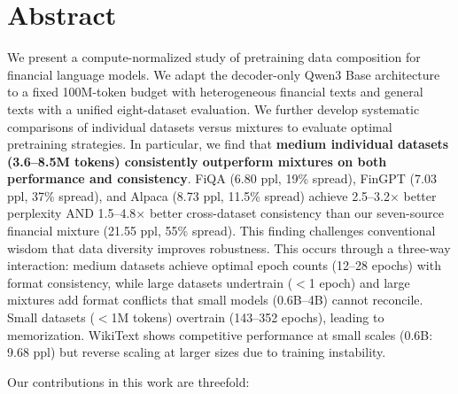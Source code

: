 \documentclass[11pt,a4paper,english,oneside]{book}
\begin{document}
\thispagestyle{empty}
\titleGP

\newpage

\setcounter{page}{1}

\section*{Abstract}
\thispagestyle{firststyle}

We present a compute-normalized study of pretraining data composition for financial language models. We adapt the decoder-only Qwen3 Base architecture to a fixed 100M-token budget with heterogeneous financial texts and general texts with a unified eight-dataset evaluation. We further develop systematic comparisons of individual datasets versus mixtures to evaluate optimal pretraining strategies. In particular, we find that \textbf{medium individual datasets (3.6–8.5M tokens) consistently outperform mixtures on both performance and consistency}. FiQA (6.80 ppl, 19\% spread), FinGPT (7.03 ppl, 37\% spread), and Alpaca (8.73 ppl, 11.5\% spread) achieve 2.5–3.2$\times$ better perplexity AND 1.5–4.8$\times$ better cross-dataset consistency than our seven-source financial mixture (21.55 ppl, 55\% spread). This finding challenges conventional wisdom that data diversity improves robustness. This occurs through a three-way interaction: medium datasets achieve optimal epoch counts (12–28 epochs) with format consistency, while large datasets undertrain ($<$1 epoch) and large mixtures add format conflicts that small models (0.6B–4B) cannot reconcile. Small datasets ($<$1M tokens) overtrain (143–352 epochs), leading to memorization. WikiText shows competitive performance at small scales (0.6B: 9.68 ppl) but reverse scaling at larger sizes due to training instability.

Our contributions in this work are threefold:
\end{document}
